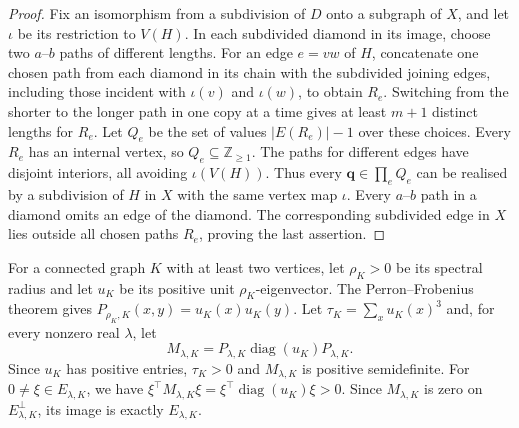 \documentclass[11pt,a4paper]{article}
\theoremstyle{plain}
\theoremstyle{definition}
\DeclareMathOperator{\diag}{diag}
\newcommand{\Z}{\mathbb{Z}}
\begin{document}
\begin{proof}
Fix an isomorphism from a subdivision of $D$ onto a subgraph of $X$,
and let $\iota$ be its restriction to $V(H)$.
In each subdivided diamond in its image, choose two $a$--$b$ paths of
different lengths. For an edge $e=vw$ of $H$, concatenate one chosen
path from each diamond in its chain with the subdivided joining edges,
including those incident with $\iota(v)$ and $\iota(w)$, to obtain $R_e$.
Switching from the shorter to the longer path in one copy at a time
gives at least $m+1$ distinct lengths for $R_e$.
Let $Q_e$ be the set of values $|E(R_e)|-1$ over these choices.
Every $R_e$ has an internal vertex, so $Q_e\subseteq\Z_{\geq1}$.
The paths for different edges have disjoint interiors, all avoiding
$\iota(V(H))$. Thus every $\mathbf q\in\prod_eQ_e$ can be realised by
a subdivision of $H$ in $X$ with the same vertex map $\iota$.
Every $a$--$b$ path in a diamond omits an edge of the diamond.
The corresponding subdivided edge in $X$ lies outside all chosen
paths $R_e$, proving the last assertion.
\end{proof}

For a connected graph $K$ with at least two vertices, let $\rho_K>0$ be its spectral
radius and let $u_K$ be its positive unit $\rho_K$-eigenvector.
The Perron--Frobenius theorem gives
$P_{\rho_K,K}(x,y)=u_K(x)u_K(y)$.
Let $\tau_K=\sum_xu_K(x)^3$ and, for every nonzero real $\lambda$, let
\begin{equation}\label{eq:perron-data}
 M_{\lambda,K}=P_{\lambda,K}\diag(u_K)P_{\lambda,K}.
\end{equation}
Since $u_K$ has positive entries, $\tau_K>0$ and $M_{\lambda,K}$ is
positive semidefinite. For $0\ne\xi\in E_{\lambda,K}$, we have
$\xi^\top M_{\lambda,K}\xi=\xi^\top\diag(u_K)\xi>0$.
Since $M_{\lambda,K}$ is zero on $E_{\lambda,K}^{\perp}$, its image
is exactly $E_{\lambda,K}$.
\end{document}
